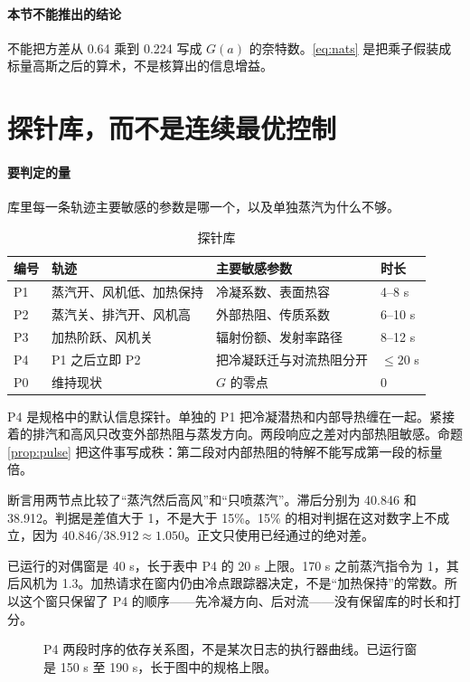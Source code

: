 \paragraph{本节不能推出的结论}
不能把方差从 0.64 乘到 0.224 写成 \(G(a)\) 的奈特数。\eqref{eq:nats} 是把乘子假装成标量高斯之后的算术，不是核算出的信息增益。

\section{探针库，而不是连续最优控制}

\paragraph{要判定的量}
库里每一条轨迹主要敏感的参数是哪一个，以及单独蒸汽为什么不够。

\begin{table}[ht]
\centering
\caption{探针库}
\begin{tabularx}{\textwidth}{lXll}
\toprule
编号 & 轨迹 & 主要敏感参数 & 时长 \\
\midrule
P1 & 蒸汽开、风机低、加热保持 & 冷凝系数、表面热容 & 4--8 s \\
P2 & 蒸汽关、排汽开、风机高 & 外部热阻、传质系数 & 6--10 s \\
P3 & 加热阶跃、风机关 & 辐射份额、发射率路径 & 8--12 s \\
P4 & P1 之后立即 P2 & 把冷凝跃迁与对流热阻分开 & \(\le 20\) s \\
P0 & 维持现状 & \(G\) 的零点 & 0 \\
\bottomrule
\end{tabularx}
\end{table}

P4 是规格中的默认信息探针。单独的 P1 把冷凝潜热和内部导热缠在一起。紧接着的排汽和高风只改变外部热阻与蒸发方向。两段响应之差对内部热阻敏感。命题 \ref{prop:pulse} 把这件事写成秩：第二段对内部热阻的特解不能写成第一段的标量倍。

断言用两节点比较了“蒸汽然后高风”和“只喷蒸汽”。滞后分别为 40.846 和 38.912。判据是差值大于 1，不是大于 15\%。15\% 的相对判据在这对数字上不成立，因为 \(40.846/38.912\approx 1.050\)。正文只使用已经通过的绝对差。

已运行的对偶窗是 40 s，长于表中 P4 的 20 s 上限。170 s 之前蒸汽指令为 1，其后风机为 1.3。加热请求在窗内仍由冷点跟踪器决定，不是“加热保持”的常数。所以这个窗只保留了 P4 的顺序——先冷凝方向、后对流——没有保留库的时长和打分。

\begin{figure}[ht]
\centering
{}
\caption{P4 两段时序的依存关系图，不是某次日志的执行器曲线。已运行窗是 150 s 至 190 s，长于图中的规格上限。}
\end{figure}


